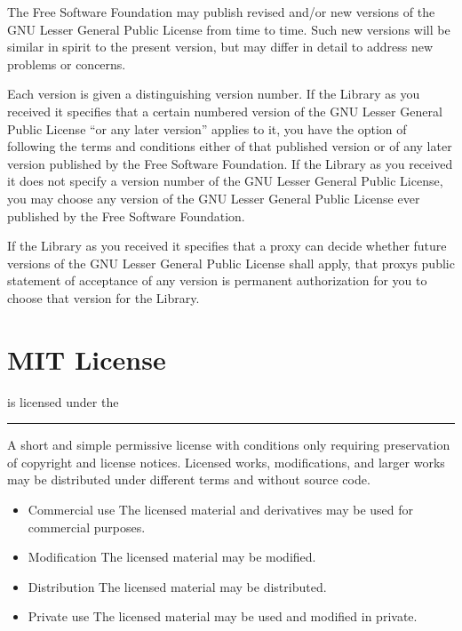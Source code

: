 \documentclass[letterpaper,10pt,english]{sphinxmanual}
\begin{document}
\begin{sphinxVerbatim}[commandchars=\\\{\}]
The Free Software Foundation may publish revised and/or new versions of the
GNU Lesser General Public License from time to time. Such new versions will
be similar in spirit to the present version, but may differ in detail to
address new problems or concerns.

Each version is given a distinguishing version number. If the Library as you
received it specifies that a certain numbered version of the GNU Lesser
General Public License “or any later version” applies to it, you have the
option of following the terms and conditions either of that published version
or of any later version published by the Free Software Foundation. If the
Library as you received it does not specify a version number of the GNU Lesser
General Public License, you may choose any version of the GNU Lesser General
Public License ever published by the Free Software Foundation.

If the Library as you received it specifies that a proxy can decide whether
future versions of the GNU Lesser General Public License shall apply, that
proxy\PYGZsq{}s public statement of acceptance of any version is permanent
authorization for you to choose that version for the Library.
\end{sphinxVerbatim}



\chapter{MIT License}
\label{\detokenize{examples/mit:mit-license}}\label{\detokenize{examples/mit::doc}}
 is licensed under the 



\bigskip\hrule\bigskip



A short and simple permissive license with conditions only requiring preservation of copyright and license notices. Licensed works, modifications, and larger works may be distributed under different terms and without source code.

\vspace{10px}

\begin{itemize}
\item {}
Commercial use \textendash{} The licensed material and derivatives may be used for commercial purposes.

\item {}
Modification \textendash{} The licensed material may be modified.

\item {}
Distribution \textendash{} The licensed material may be distributed.

\item {}
Private use \textendash{} The licensed material may be used and modified in private.

\end{itemize}
\end{document}
